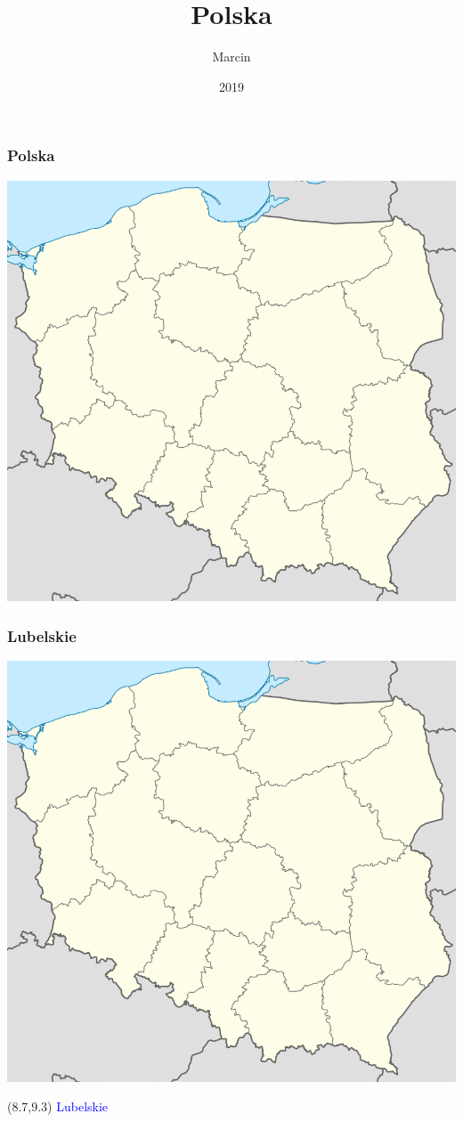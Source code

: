 \documentclass{beamer}
\title{Polska}
\author{Marcin}
\institute{Wydział EAIiIB\\
	Katedra Informatyki Stosowanej}
\date{2019}
\begin{document}
 
	\frame{\titlepage}
	
	
	\begin{frame}
	\frametitle{Polska}
	\includegraphics[scale=0.25]{Polska}
\end{frame}

\begin{frame}
\frametitle{Lubelskie}
\includegraphics[scale=0.25]{Polska}
\begin{textblock}{3}(8.7,9.3)
	\textcolor{blue}{Lubelskie}
\end{textblock}
\end{frame}
\end{document}
